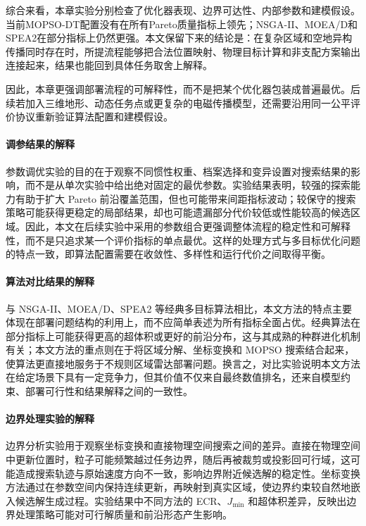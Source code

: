 综合来看，本章实验分别检查了优化器表现、边界可达性、内部参数和建模假设。当前MOPSO-DT配置没有在所有Pareto质量指标上领先；NSGA-II、MOEA/D和SPEA2在部分指标上仍然更强。本文保留下来的结论是：在复杂区域和空地异构传播同时存在时，所提流程能够把合法位置映射、物理目标计算和非支配方案输出连接起来，结果也能回到具体任务取舍上解释。

因此，本章更强调部署流程的可解释性，而不是把某个优化器包装成普遍最优。后续若加入三维地形、动态任务点或更复杂的电磁传播模型，还需要沿用同一公平评价协议重新验证算法配置和建模假设。

\FloatBarrier

\paragraph{调参结果的解释}
参数调优实验的目的在于观察不同惯性权重、档案选择和变异设置对搜索结果的影响，而不是从单次实验中给出绝对固定的最优参数。实验结果表明，较强的探索能力有助于扩大 Pareto 前沿覆盖范围，但也可能带来间距指标波动；较保守的搜索策略可能获得更稳定的局部结果，却也可能遗漏部分代价较低或性能较高的候选区域。因此，本文在后续实验中采用的参数组合更强调整体流程的稳定性和可解释性，而不是只追求某一个评价指标的单点最优。这样的处理方式与多目标优化问题的特点一致，即算法配置需要在收敛性、多样性和运行代价之间取得平衡。

\paragraph{算法对比结果的解释}
与 NSGA-II、MOEA/D、SPEA2 等经典多目标算法相比，本文方法的特点主要体现在部署问题结构的利用上，而不应简单表述为所有指标全面占优。经典算法在部分指标上可能获得更高的超体积或更好的前沿分布，这与其成熟的种群进化机制有关；本文方法的重点则在于将区域分解、坐标变换和 MOPSO 搜索结合起来，使算法更直接地服务于不规则区域雷达部署问题。换言之，对比实验说明本文方法在给定场景下具有一定竞争力，但其价值不仅来自最终数值排名，还来自模型约束、部署可行性和结果解释之间的一致性。

\paragraph{边界处理实验的解释}
边界分析实验用于观察坐标变换和直接物理空间搜索之间的差异。直接在物理空间中更新位置时，粒子可能频繁越过任务边界，随后再被裁剪或投影回可行域，这可能造成搜索轨迹与原始速度方向不一致，影响边界附近候选解的稳定性。坐标变换方法通过在参数空间内保持连续更新，再映射到真实区域，使边界约束较自然地嵌入候选解生成过程。实验结果中不同方法的 ECR、$J_{\min}$ 和超体积差异，反映出边界处理策略可能对可行解质量和前沿形态产生影响。

